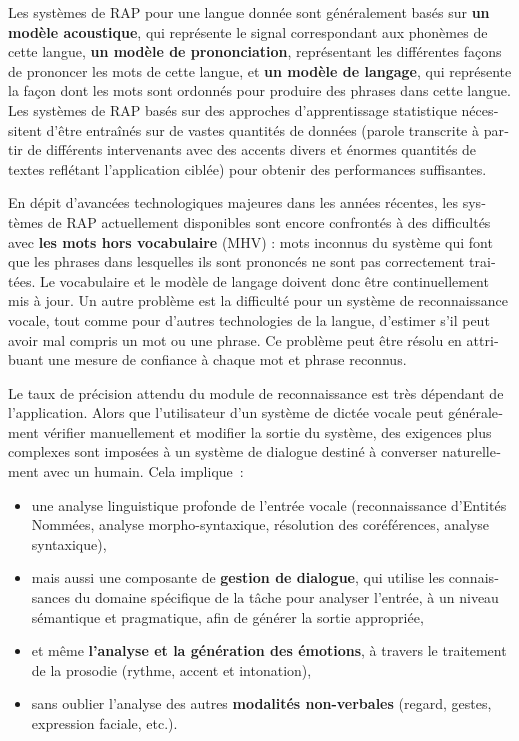 \begin{french}
\begin{multicols}{2}
Les systèmes de RAP pour une langue donnée sont généralement basés sur
{\bf un modèle acoustique}, qui représente le signal correspondant aux
phonèmes de cette langue, {\bf un modèle de prononciation},
représentant les différentes façons de prononcer les mots de cette
langue, et {\bf un modèle de langage}, qui représente la façon dont
les mots sont ordonnés pour produire des phrases dans cette
langue. Les systèmes de RAP basés sur des approches d'apprentissage statistique nécessitent d'être entraînés sur
de vastes quantités de données (parole transcrite à partir de
différents intervenants avec des accents divers et énormes quantités
de textes reflétant l'application ciblée) pour obtenir des
performances suffisantes.

En dépit d'avancées technologiques majeures dans les années récentes,
les systèmes de RAP actuellement disponibles sont encore confrontés à
des difficultés avec {\bf les mots hors vocabulaire} (MHV) : mots
inconnus du système qui font que les phrases dans lesquelles ils sont
prononcés ne sont pas correctement traitées. Le vocabulaire et le
modèle de langage doivent donc être continuellement mis à jour. Un
autre problème est la difficulté pour un système de reconnaissance
vocale, tout comme pour d'autres technologies de la langue,
d'estimer s'il peut avoir mal compris un mot ou une phrase. Ce
problème peut être résolu en attribuant une mesure de confiance à
chaque mot et phrase reconnus.

Le taux de précision attendu du module de reconnaissance est très
dépendant de l'application. Alors que l'utilisateur d'un système de
dictée vocale peut généralement vérifier manuellement et modifier la
sortie du système, des exigences plus complexes sont imposées à un
système de dialogue destiné à converser naturellement avec un
humain. Cela implique~: 
\begin{itemize}
\item une analyse linguistique profonde de l'entrée vocale
  (reconnaissance d'Entités Nommées, analyse morpho-syntaxique,
  résolution des coréférences, analyse syntaxique),
\item mais aussi une composante de {\bf gestion de dialogue}, qui
  utilise les connaissances du domaine spécifique de la tâche pour
  analyser l'entrée, à un niveau sémantique et pragmatique, afin de
  générer la sortie appropriée,
\item et même {\bf l'analyse et la génération des émotions}, à
  travers le traitement de la prosodie (rythme, accent et intonation),
\item sans oublier l'analyse des autres {\bf modalités non-verbales}
  (regard, gestes, expression faciale, etc.).
\end{itemize}


\end{multicols}
\end{french}
